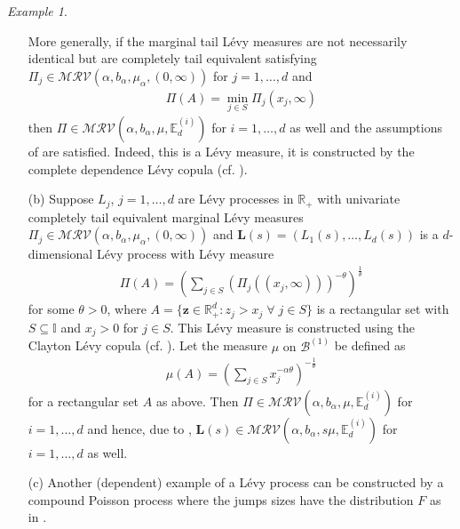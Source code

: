 \documentclass[aos]{imsart}
\numberwithin{equation}{section}
\theoremstyle{plain} %
\theoremstyle{remark}
\newtheorem{example}[theorem]{Example}
\newcommand{\beao}{\begin{eqnarray*}}
\newcommand{\eeao}{\end{eqnarray*}\noindent}
\newcommand{\E}{\mathbb{E}}
\newcommand{\R}{\mathbb{R}}
\def\MRV{\mathcal{MRV}}
\def\bL{\boldsymbol L}
\def\bz{\boldsymbol z}
\newcommand{\ov}{\overline}
\begin{document}
\begin{example}
\begin{enumerate}
    More generally,  if the marginal 
    tail L\'evy measures are not necessarily identical {but are completely tail equivalent} satisfying $ \Pi_j\in \MRV(\alpha,b_{\alpha},\mu_\alpha,(0,\infty))$
for $j=1,\ldots,d$
    and 
    \beao
        \Pi(A)=\min_{j\in S}\Pi_j(x_j,\infty)
    \eeao
    then $\Pi\in \MRV(\alpha,b_{\alpha},\mu,\E_d^{(i)})$ for $i=1,\ldots,d$ as well and the assumptions of  are satisfied. Indeed, this is a L\'evy measure, it is constructed by the complete dependence L\'evy copula (cf. \cite{Kallsen:Tankov:2006}).
    \item[(b)]  Suppose $L_j$, $j=1,\ldots,d$ are L\'evy processes in $\R_+$ with univariate {completely tail equivalent} marginal L\'evy measures $\Pi_j\in \MRV(\alpha,b_{\alpha},\mu_\alpha,(0,\infty))$
    and $\bL(s)=(L_1(s),\ldots,L_d(s))$ is a $d$-dimensional
    L\'evy process with L\'evy measure
    \beao
        \Pi(A)=\left(\sum_{j\in S}\left(\Pi_j((x_j,\infty))\right)^{-\theta}\right)^{\frac{1}{\theta}}
    \eeao
    for some $\theta>0$, where $A= \{\bz \in \R_+^d: z_j>x_j \;\forall\; j\in S\}$ is a rectangular set with
 $S\subseteq \mathbb{I}$  and  $x_{j}>0$ for $j\in S$.
    This  L\'evy measure is constructed using the Clayton L\'evy copula (cf. \cite{Kallsen:Tankov:2006}). Let the measure $\mu$ { on $\mathcal{B}^{(1)}$} be defined as
    \beao
        \mu(A)=\left(\sum_{j\in S}x_j^{-\alpha\theta}\right)^{-\frac{1}{\theta}}
    \eeao
    for a rectangular set $A$ as above.  Then $\Pi\in
    \MRV(\alpha,b_{\alpha},\mu,\E_d^{(i)})$ for $i=1,\ldots,d$
    and hence, due to , 
    $\bL(s)\in
    \MRV(\alpha,b_{\alpha},s\mu,\E_d^{(i)})$ for $i=1,\ldots,d$ as well. 
    \item[(c)]{Another (dependent) example of a L\'evy process can be constructed by a compound Poisson process where the jumps sizes have the distribution $F$ as in .}
\end{enumerate}
\end{example}
\end{document}
